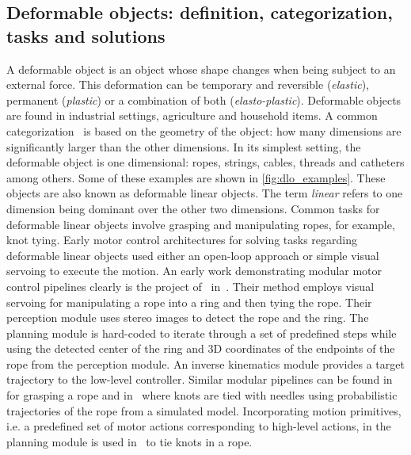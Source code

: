 \subsection{Deformable objects: definition, categorization, tasks and solutions}
A deformable object is an object whose shape changes when being subject to an external force. This deformation can be temporary and reversible (\textit{elastic}), permanent (\textit{plastic}) or a combination of both (\textit{elasto-plastic}). Deformable objects are found in industrial settings, agriculture and household items. A common categorization~\autocite{Saadat2002,Jimenez2012} is based on the geometry of the object: how many dimensions are significantly larger than the other dimensions.
In its simplest setting, the deformable object is one dimensional: ropes, strings, cables, threads and catheters among others. Some of these examples are shown in \cref{fig:dlo_examples}. These objects are also known as deformable linear objects. The term \textit{linear} refers to one dimension being dominant over the other two dimensions. Common tasks for deformable linear objects involve grasping and manipulating ropes, for example, knot tying. Early motor control architectures for solving tasks regarding deformable linear objects used either an open-loop approach or simple visual servoing to execute the motion. An early work demonstrating modular motor control pipelines clearly is the project of~\citeauthor{Inaba1987} in~\citeyear{Inaba1987}. Their method employs visual servoing for manipulating a rope into a ring and then tying the rope. Their perception module uses stereo images to detect the rope and the ring. The planning module is hard-coded to iterate through a set of predefined steps while using the detected center of the ring and 3D coordinates of the endpoints of the rope from the perception module. An inverse kinematics module provides a target trajectory to the low-level controller. Similar modular pipelines can be found in~\autocite{Remde1999} for grasping a rope and in~\autocite{Saha2007} where knots are tied with needles using probabilistic trajectories of the rope from a simulated model. Incorporating motion primitives, i.e. a predefined set of motor actions corresponding to high-level actions, in the planning module is used in~\autocite{Yamakawa2008, Vinh2012} to tie knots in a rope.

